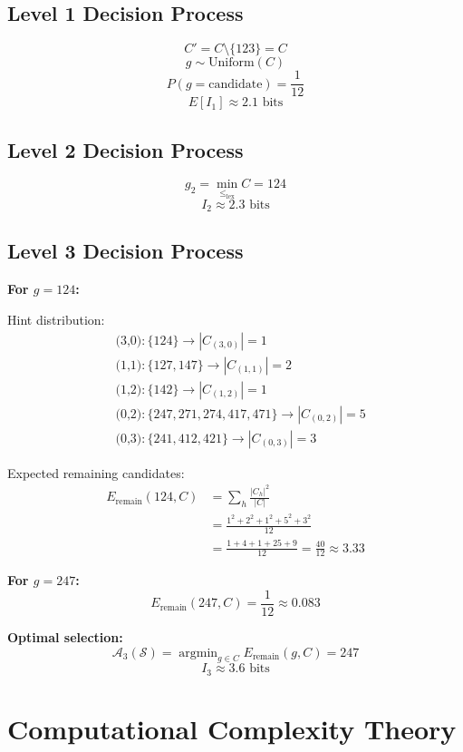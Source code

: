 \documentclass{article}
\DeclareMathOperator*{\argmin}{argmin}
\begin{document}
\subsection{Level 1 Decision Process}
$$C' = C \setminus \{123\} = C$$
$$g \sim \text{Uniform}(C)$$
$$P(g = \text{candidate}) = \frac{1}{12}$$
$$E[I_1] \approx 2.1 \text{ bits}$$

\subsection{Level 2 Decision Process}
$$g_2 = \min_{\leq_{\text{lex}}} C = 124$$
$$I_2 \approx 2.3 \text{ bits}$$

\subsection{Level 3 Decision Process}

\textbf{For $g = 124$:}

Hint distribution:
\begin{align}
&\text{(3,0)}: \{124\} \rightarrow |C_{(3,0)}| = 1 \\
&\text{(1,1)}: \{127, 147\} \rightarrow |C_{(1,1)}| = 2 \\
&\text{(1,2)}: \{142\} \rightarrow |C_{(1,2)}| = 1 \\
&\text{(0,2)}: \{247, 271, 274, 417, 471\} \rightarrow |C_{(0,2)}| = 5 \\
&\text{(0,3)}: \{241, 412, 421\} \rightarrow |C_{(0,3)}| = 3
\end{align}

Expected remaining candidates:
\begin{align}
E_{\text{remain}}(124, C) &= \sum_{h} \frac{|C_h|^2}{|C|} \\
&= \frac{1^2 + 2^2 + 1^2 + 5^2 + 3^2}{12} \\
&= \frac{1 + 4 + 1 + 25 + 9}{12} = \frac{40}{12} \approx 3.33
\end{align}

\textbf{For $g = 247$:}
$$E_{\text{remain}}(247, C) = \frac{1}{12} \approx 0.083$$

\textbf{Optimal selection:}
$$\mathcal{A}_3(\mathcal{S}) = \argmin_{g \in C} E_{\text{remain}}(g, C) = 247$$
$$I_3 \approx 3.6 \text{ bits}$$

\section{Computational Complexity Theory}
\end{document}
